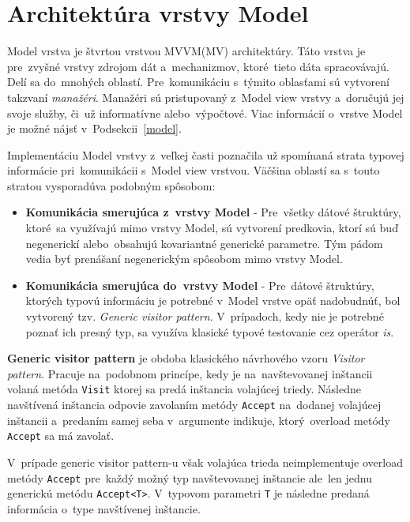 \chapter{Architektúra vrstvy Model}\label{architektura_model_vrstvy}

Model vrstva je štvrtou vrstvou MVVM(MV) architektúry. Táto vrstva je pre~zvyšné vrstvy zdrojom dát a~mechanizmov, ktoré~tieto dáta spracovávajú. Delí sa do~mnohých oblastí. Pre~komunikáciu s~týmito oblasťami sú vytvorení takzvaní \textit{manažéri}. Manažéri sú pristupovaný z~Model view vrstvy a~doručujú jej svoje služby, či~už informatívne alebo~výpočtové. Viac informácií o~vrstve Model je možné nájsť v~Podsekcii~\ref{model}.

Implementáciu Model vrstvy z~veľkej časti poznačila už spomínaná strata typovej informácie pri~komunikácii s~Model view vrstvou. Väčšina oblastí sa s~touto stratou vysporadúva podobným spôsobom:
\begin{itemize}
    \item \textbf{Komunikácia smerujúca z~vrstvy Model} - Pre~všetky dátové štruktúry, ktoré~sa využívajú mimo vrstvy Model, sú vytvorení predkovia, ktorí sú buď negenerickí alebo~obsahujú kovariantné generické parametre. Tým pádom vedia byť prenášaní negenerickým spôsobom mimo vrstvy Model.
    \item \textbf{Komunikácia smerujúca do~vrstvy Model} - Pre~dátové štruktúry, ktorých typovú informáciu je potrebné v~Model vrstve opäť nadobudnúť, bol vytvorený tzv. \textit{Generic visitor pattern}. V~prípadoch, kedy nie je potrebné poznať ich presný typ, sa využíva klasické typové testovanie cez operátor \textit{is}.
\end{itemize} 

\textbf{Generic visitor pattern} je obdoba klasického návrhového vzoru \emph{Visitor pattern}. Pracuje na~podobnom princípe, kedy je na~navštevovanej inštancii volaná metóda \texttt{Visit} ktorej sa predá inštancia volajúcej triedy. Následne navštívená inštancia odpovie zavolaním metódy \texttt{Accept} na~dodanej volajúcej inštancii a~predaním samej seba v~argumente indikuje, ktorý~overload metódy \texttt{Accept} sa má zavolať.

V~prípade generic visitor pattern-u však volajúca trieda neimplementuje overload metódy \texttt{Accept} pre~každý možný typ navštevovanej inštancie ale~len jednu generickú metódu \texttt{Accept<T>}. V~typovom parametri \texttt{T} je následne predaná informácia o~type navštívenej inštancie.

\bigskip

